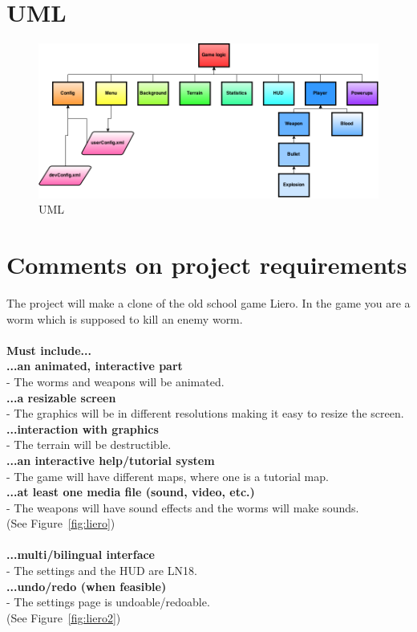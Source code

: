 \documentclass{article}
\begin{document}
\clearpage
\section{UML}
\begin{figure}[h!]
\centering
\includegraphics[width=\textwidth, height=\textheight, keepaspectratio, natwidth=720, natheight=540]{uml.png}
\caption{UML}
\label{fig:uml}
\end{figure}
\clearpage
\section{Comments on project requirements}
The project will make a clone of the old school game Liero. In the game you are a worm which is supposed to kill an enemy worm.
\\ \\
\textbf{Must include...} \\
\textbf{...an animated, interactive part}
\\ - The worms and weapons will be animated. \\
\textbf{...a resizable screen}
\\ - The graphics will be in different resolutions making it easy to resize the screen. \\
\textbf{...interaction with graphics}
\\ - The terrain will be destructible. \\
\textbf{...an interactive help/tutorial system}
\\ - The game will have different maps, where one is a tutorial map. \\
\textbf{...at least one media file (sound, video, etc.)}
\\ - The weapons will have sound effects and the worms will make sounds. \\
(See Figure~\ref{fig:liero})
\\ \\
\textbf{...multi/bilingual interface} \\
 - The settings and the HUD are LN18. \\
\textbf{...undo/redo (when feasible)} \\
 - The settings page is undoable/redoable. \\
(See Figure~\ref{fig:liero2})
\end{document}
